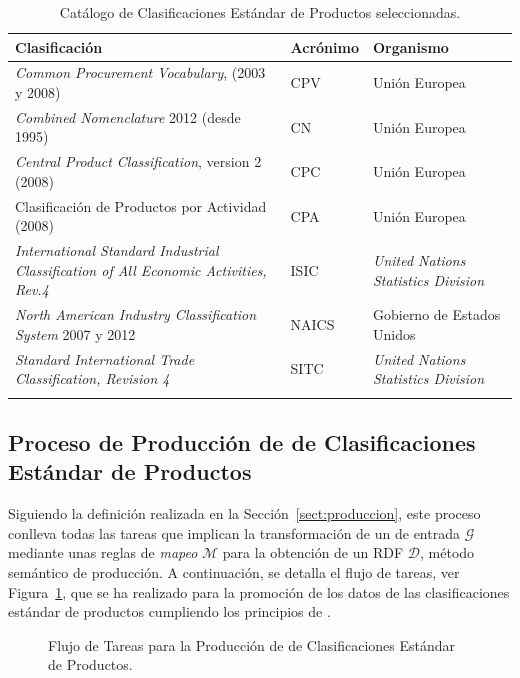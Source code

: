 \begin{longtable}[c]{|p{6cm}|l|p{6cm}|} 
\hline
  \textbf{Clasificación} &  \textbf{Acrónimo} & \textbf{Organismo} \\\hline
\endhead
\textit{Common Procurement Vocabulary}, (2003 y 2008) & \gls{CPV} & Unión Europea \\ \hline
\textit{Combined Nomenclature} 2012 (desde 1995) & \gls{CN} & Unión Europea  \\ \hline
\textit{Central Product Classification}, version 2 (2008) & \gls{CPC} & Unión Europea \\ \hline
Clasificación de Productos por Actividad (2008) & \gls{CPA} & Unión Europea \\ \hline
\textit{International Standard Industrial Classification of All Economic Activities, Rev.4} & \gls{ISIC} & \textit{United Nations Statistics Division} \\ \hline
\textit{North American Industry Classification System} 2007 y 2012 & \gls{NAICS} & Gobierno de Estados Unidos \\ \hline
\textit{Standard International Trade Classification, Revision 4} & \gls{SITC} & \textit{United Nations Statistics Division} \\ \hline
\hline
\caption{Catálogo de Clasificaciones Estándar de Productos seleccionadas.}\label{table:pscs-ld}\\    
\end{longtable}

\subsection{Proceso de Producción de \linkeddata de Clasificaciones Estándar de Productos}
Siguiendo la definición realizada en la Sección~\ref{sect:produccion}, este proceso conlleva
todas las tareas que implican la transformación de un \dataset de entrada $\mathcal{G}$ mediante
unas reglas de \textit{mapeo} $\mathcal{M}$ para la obtención de un \dataset \gls{RDF} $\mathcal{D}$, método semántico 
de producción. A continuación, se detalla el flujo de tareas, ver Figura~\ref{fig:produccion-pscs}, que se ha realizado para la 
promoción de los datos de las clasificaciones estándar de productos cumpliendo los principios de \linkeddata.

\begin{figure}[!htp]
	\caption{Flujo de Tareas para la Producción de \linkeddata de Clasificaciones Estándar de Productos.}
	\label{fig:produccion-pscs}
\end{figure}

